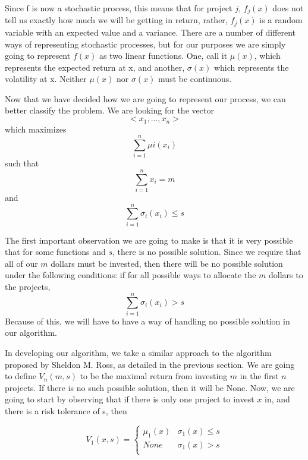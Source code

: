 \documentclass{article}
\begin{document}
\breakline
\par
Since f is now a stochastic process, this means that for project $j$,  $f_{j}(x)$ does not tell us exactly how much we will be getting in return, rather, $f_{j}(x)$ is a random variable with an expected value and a variance. There are a number of different ways of representing stochastic processes, but for our purposes we are simply going to represent $f(x)$ as two linear functions. One, call it $\mu(x)$, which represents the expected return at x, and another, $\sigma(x)$ which represents the volatility at x.  Neither $\mu(x)$ nor $\sigma(x)$ must be continuous.  
\newline
\par
Now that we have decided how we are going to represent our process, we can better classify the problem.  We are looking for the vector $$<x_{1},...,x_{n}>$$ which maximizes 
$$\sum_{i=1}^{n} \mu{i}(x_{i})$$
such that
$$\sum_{i=1}^{n}x_{i} = m$$
and
$$\sum_{i=1}^{n} \sigma_{i}(x_{i}) \leq s$$
\newline
\par
The first important observation we are going to make is that it is very possible that for some functions and $s$, there is no possible solution. Since we require that all of our $m$ dollars must be invested, then there will be no possible solution under the following conditions:
\newline
if for all possible ways to allocate the $m$ dollars to the projects, 
$$\sum_{i=1}^{n} \sigma_{i}(x_{i}) > s$$
Because of this, we will have to have a way of handling no possible solution in our algorithm.  
\newline
\par
In developing our algorithm, we take a similar approach to the algorithm proposed by Sheldon M. Ross, as detailed in the previous section.
\newline
We are going to define $V_{n}(m, s)$ to be the maximal return from investing $m$ in the first $n$ projects.  If there is no such possible solution, then it will be None.
\newline
Now, we are going to start by observing that if there is only one project to invest $x$ in, and there is a risk tolerance of s, then 

\[V_{1}(x, s) =  \begin{cases} 
      \mu_{1}(x) & \sigma_{1}(x) \leq s \\
      None & \sigma_{1}(x) > s \\
   \end{cases}
\]
\end{document}
